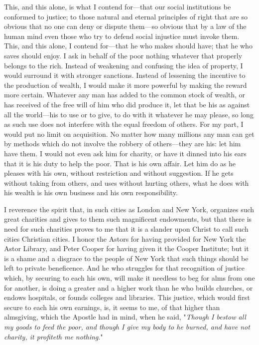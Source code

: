 \documentclass{book}
\begin{document}
This, and this alone, is what I contend for—that our social institutions be conformed to justice; to those natural and eternal principles of right that are so obvious that no one can deny or dispute them—so obvious that by a law of the human mind even those who try to defend social injustice must invoke them. This, and this alone, I contend for—that he who makes should have; that he who saves should enjoy. I ask in behalf of the poor nothing whatever that properly belongs to the rich. Instead of weakening and confusing the idea of property, I would surround it with stronger sanctions. Instead of lessening the incentive to the production of wealth, I would make it more powerful by making the reward more certain. Whatever any man has added to the common stock of wealth, or has received of the free will of him who did produce it, let that be his as against all the world—his to use or to give, to do with it whatever he may please, so long as such use does not interfere with the equal freedom of others. For my part, I would put no limit on acquisition. No matter how many millions any man can get by methods which do not involve the robbery of others—they are his: let him have them. I would not even ask him for charity, or have it dinned into his ears that it is his duty to help the poor. That is his own affair. Let him do as he pleases with his own, without restriction and without suggestion. If he gets without taking from others, and uses without hurting others, what he does with his wealth is his own business and his own responsibility.

I reverence the spirit that, in such cities as London and New York, organizes such great charities and gives to them such magnificent endowments, but that there is need for such charities proves to me that it is a slander upon Christ to call such cities Christian cities. I honor the Astors for having provided for New York the Astor Library, and Peter Cooper for having given it the Cooper Institute; but it is a shame and a disgrace to the people of New York that such things should be left to private beneficence. And he who struggles for that recognition of justice which, by securing to each his own, will make it needless to beg for alms from one for another, is doing a greater and a higher work than he who builds churches, or endows hospitals, or founds colleges and libraries. This justice, which would first secure to each his own earnings, is, it seems to me, of that higher than almsgiving, which the Apostle had in mind, when he said, "\emph{Though I bestow all my goods to feed the poor, and though I give my body to he burned, and have not charity, it profiteth me nothing}."
\end{document}
